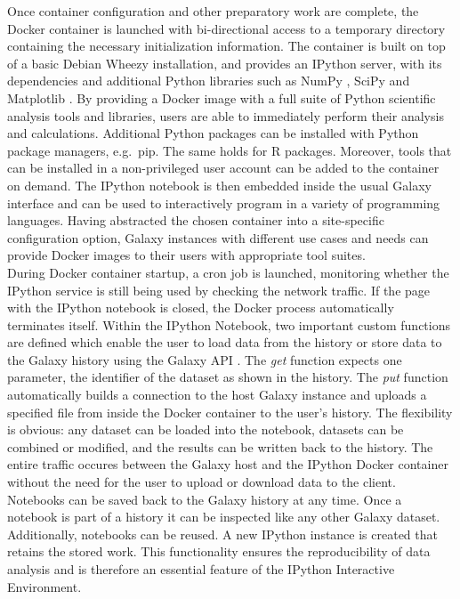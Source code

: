 \documentclass{bioinfo}
\begin{document}
\begin{methods}
Once container configuration and other preparatory work are complete, the Docker container is launched with bi-directional
access to a temporary directory containing the necessary initialization information. The container is built on top of a basic Debian Wheezy installation,
and provides an IPython server, with its dependencies and additional Python libraries such as NumPy \citep{Walt2011}, SciPy \citep{Jones2015} and Matplotlib \citep{Hunter2007}.
By providing a Docker image with a full suite of Python scientific analysis tools and libraries, users are able 
to immediately perform their analysis and calculations. Additional Python packages can be installed with Python
package managers, e.g.\ pip. The same holds for R packages. Moreover, tools that can be installed in a non-privileged user account can be added to the container on demand. 
The IPython notebook is then embedded inside the usual Galaxy interface and can be used to interactively program in a variety of programming languages.
Having abstracted the chosen container into a site-specific configuration option, Galaxy instances with different use cases
and needs can provide Docker images to their users with appropriate tool suites.\\
During Docker container startup, a cron job is launched, monitoring whether the IPython service
is still being used by checking the network traffic. If the page with the IPython notebook is closed, the
Docker process automatically terminates itself. Within the IPython Notebook, 
two important custom functions are defined which enable the
user to load data from the history or store data to the Galaxy history using the Galaxy API \citep{Sloggett2013}.
The \textit{get} function expects one parameter, the identifier of the dataset as shown in the history.
The \textit{put} function automatically builds a connection to the host
Galaxy instance and uploads a specified file from inside the Docker container to the user's
history. The flexibility is obvious: any dataset can be
loaded into the notebook, datasets can be combined or modified, and the results can be written back to the history.
The entire traffic occures between the Galaxy host and the IPython Docker container without the need for the user to upload or download data to the client. \\
Notebooks can be saved back to the Galaxy history at any time. Once a notebook is part of a history 
it can be inspected like any other Galaxy dataset. 
Additionally, notebooks can be reused. A new IPython instance is created that retains the stored work. 
This functionality ensures the reproducibility of data analysis and is therefore an essential
feature of the IPython Interactive Environment.



\end{methods}
\end{document}
